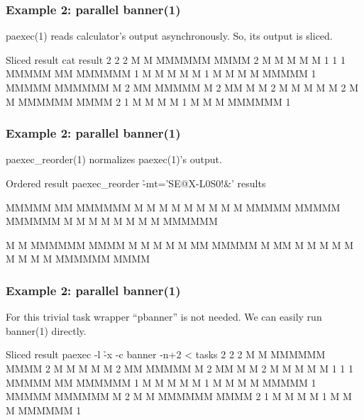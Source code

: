 \documentclass[hyperref={colorlinks=true}]{beamer}
\begin{document}
\linespread{0.5}
\begin{frame}[fragile]
  \frametitle{Example 2: parallel banner(1)}
paexec(1) reads calculator's output asynchronously.
So, its output is sliced.
  \begin{block}{}
      \begin{CodeSmall}{Sliced result}
\prompt{\$} cat result
2 
2 
2  M    M  MMMMMM   MMMM
2   M  M   M       M    M
1 
1 
1  MMMMM     MM    MMMMMM
1  M    M   M  M   M
1  M    M  M    M  MMMMM
1  MMMMM   MMMMMM  M
2    MM    MMMMM   M
2    MM    M       M
2   M  M   M       M    M
2  M    M  MMMMMM   MMMM
2 
1  M       M    M  M
1  M       M    M  MMMMMM
1 
\prompt{\$}
      \end{CodeSmall}
  \end{block}
\end{frame}
\linespread{1}

\linespread{0.5}
\begin{frame}[fragile]
  \frametitle{Example 2: parallel banner(1)}
paexec\_reorder(1) normalizes paexec(1)'s output.
  \begin{block}{}
      \begin{CodeSmall}{Ordered result}
\prompt{\$} paexec_reorder \h{-mt='SE@X-L0S0!&'} results


MMMMM     MM    MMMMMM
M    M   M  M   M
M    M  M    M  MMMMM
MMMMM   MMMMMM  M
M       M    M  M
M       M    M  MMMMMM



M    M  MMMMMM   MMMM
 M  M   M       M    M
  MM    MMMMM   M
  MM    M       M
 M  M   M       M    M
M    M  MMMMMM   MMMM


\prompt{\$}
      \end{CodeSmall}
  \end{block}
\end{frame}
\linespread{1}

\linespread{0.5}
\begin{frame}[fragile]
  \frametitle{Example 2: parallel banner(1)}
For this trivial task wrapper ``pbanner'' is not needed.
We can easily run banner(1) directly.
  \begin{block}{}
      \begin{CodeSmall}{Sliced result}
\prompt{\$} paexec -l \h{-x} -c banner -n+2 < tasks
2 
2 
2  M    M  MMMMMM   MMMM
2   M  M   M       M    M
2    MM    MMMMM   M
2    MM    M       M
2   M  M   M       M    M
1 
1 
1  MMMMM     MM    MMMMMM
1  M    M   M  M   M
1  M    M  M    M  MMMMM
1  MMMMM   MMMMMM  M
2  M    M  MMMMMM   MMMM
2 
1  M       M    M  M
1  M       M    M  MMMMMM
1 
\prompt{\$}
      \end{CodeSmall}
  \end{block}
\end{frame}
\linespread{1}
\end{document}
